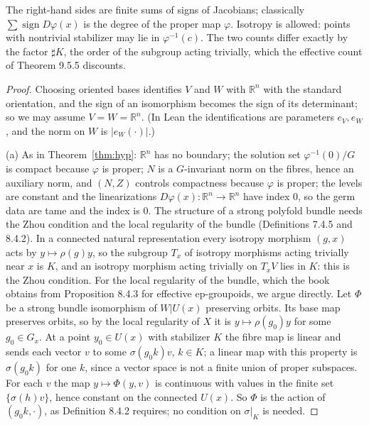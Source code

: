 \documentclass[11pt,a4paper]{article}
\theoremstyle{plain}
\theoremstyle{definition}
\theoremstyle{remark}
\newcommand{\R}{\mathbb{R}}
\newcommand{\abs}[1]{\lvert #1\rvert}
\newcommand{\card}{\sharp}
\begin{document}
The right-hand sides are finite sums of signs of Jacobians; classically $\sum\operatorname{sign}D\varphi(x)$
is the degree of the proper map $\varphi$. Isotropy is allowed: points with nontrivial stabilizer may lie
in $\varphi^{-1}(c)$. The two counts differ exactly by the factor $\card K$, the order of the subgroup
acting trivially, which the effective count of Theorem 9.5.5 discounts.

\begin{proof}
Choosing oriented bases identifies $V$ and $W$ with $\R^n$ with the standard orientation, and the sign
of an isomorphism becomes the sign of its determinant; so we may assume $V=W=\R^n$. (In Lean the identifications are parameters $e_V,e_W$, and the norm on $W$ is
$\abs{e_W(\cdot)}$.)

(a) As in Theorem~\ref{thm:hyp}: $\R^n$ has no boundary; the solution set $\varphi^{-1}(0)/G$ is compact
because $\varphi$ is proper; $N$ is a $G$-invariant norm on the fibres, hence an auxiliary norm, and
$(N,Z)$ controls compactness because $\varphi$ is proper; the levels are constant and the linearizations
$D\varphi(x)\colon\R^n\to\R^n$ have index $0$, so the germ data are tame and the index is $0$.
The structure of a strong polyfold bundle needs the Zhou condition and the local regularity of the
bundle (Definitions 7.4.5 and 8.4.2). In a connected natural representation every isotropy morphism
$(g,x)$ acts by $y\mapsto\rho(g)y$, so the subgroup $T_x$ of isotropy morphisms acting trivially near $x$
is $K$, and an isotropy morphism acting trivially on $T_xV$ lies in $K$: this is the Zhou condition.
For the local regularity of the bundle, which the book obtains from Proposition 8.4.3 for effective
ep-groupoids, we argue directly. Let $\Phi$ be a strong bundle isomorphism of $W|U(x)$ preserving
orbits. Its base map preserves orbits, so by the local regularity of $X$ it is $y\mapsto\rho(g_0)y$ for
some $g_0\in G_x$. At a point $y_0\in U(x)$ with stabilizer $K$ the fibre map is linear and sends each
vector $v$ to some $\sigma(g_0k)v$, $k\in K$; a linear map with this property is $\sigma(g_0k)$ for one
$k$, since a vector space is not a finite union of proper subspaces. For each $v$ the map
$y\mapsto\Phi(y,v)$ is continuous with values in the finite set $\{\sigma(h)v\}$, hence constant on the
connected $U(x)$. So $\Phi$ is the action of $(g_0k,\cdot)$, as Definition 8.4.2 requires; no condition on
$\sigma|_K$ is needed.


\end{proof}
\end{document}
